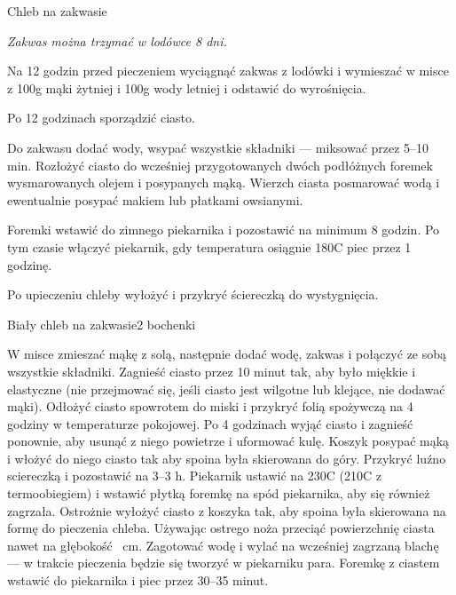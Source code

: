 \documentclass[a4paper,12pt]{article}
\begin{document}
\begin{recipe}{Chleb na zakwasie}{}{}
\freeform%
\begin{center}
\textit{Zakwas można trzymać w lodówce 8 dni.}
\end{center}


Na 12 godzin przed pieczeniem wyciągnąć zakwas z lodówki i wymieszać w misce z 100g mąki żytniej i 100g wody letniej i odstawić do wyrośnięcia.

\freeform%
Po 12 godzinach sporządzić ciasto.

Do zakwasu dodać wody, wsypać wszystkie składniki --- miksować przez 5--10 min.
Rozłożyć ciasto do wcześniej przygotowanych dwóch podłóżnych foremek wysmarowanych olejem i posypanych mąką. Wierzch ciasta posmarować wodą i
ewentualnie posypać makiem lub płatkami owsianymi.

Foremki wstawić do zimnego piekarnika i pozostawić na minimum 8 godzin. Po tym czasie włączyć piekarnik, gdy temperatura osiągnie 180\0C piec przez 1 godzinę.

Po upieczeniu chleby wyłożyć i przykryć ściereczką do wystygnięcia.

\end{recipe}

\newpage

\begin{recipe}{Biały chleb na zakwasie}{2 bochenki}{}

W misce zmieszać mąkę z solą, następnie dodać wodę, zakwas i połączyć ze sobą
wszystkie składniki. Zagnieść ciasto przez 10 minut tak, aby było miękkie i
elastyczne (nie przejmować się, jeśli ciasto jest wilgotne lub klejące, nie
dodawać mąki).  
\freeform%
Odłożyć ciasto spowrotem do miski i przykryć folią spożywczą na
4 godziny w temperaturze pokojowej. Po 4 godzinach wyjąć ciasto i zagnieść
ponownie, aby usunąć z niego powietrze i uformować kulę.
Koszyk posypać mąką i włożyć do niego ciasto tak aby spoina była skierowana do
góry. Przykryć luźno sciereczką i pozostawić na 3--3 h. Piekarnik
ustawić na 230\0C (210\0C z termoobiegiem) i wstawić płytką foremkę
na spód piekarnika, aby się również zagrzała. Ostrożnie wyłożyć
ciasto z koszyka tak, aby spoina była skierowana na formę do pieczenia chleba. Używając ostrego
noża przeciąć powierzchnię ciasta nawet na głębokość  cm. Zagotować
wodę i wylać na wcześniej zagrzaną blachę --- w trakcie pieczenia
będzie się tworzyć w piekarniku para. Foremkę z ciastem wstawić do piekarnika i
piec przez 30--35 minut.

\end{recipe}
\end{document}

